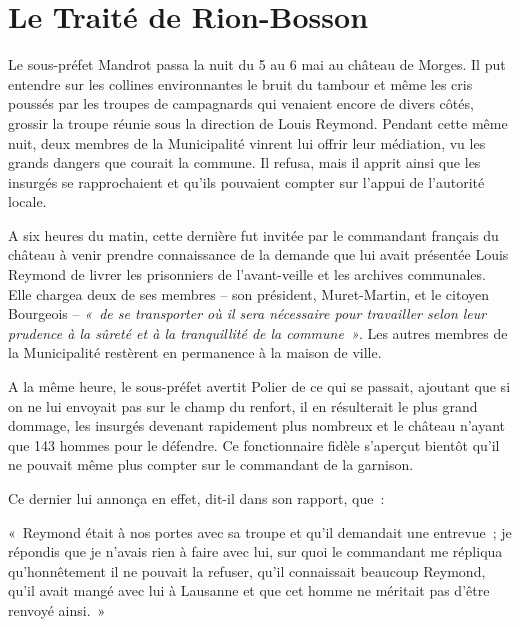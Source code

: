 \documentclass[french,twoside]{book} %
\newenvironment{quoteblock}%
  {\begin{quoting}}
  {\end{quoting}}
\newenvironment{quotebar}{%
    \def\FrameCommand{{\color{rubric!10!}\vrule width 0.5em} \hspace{0.9em}}%
    \def\OuterFrameSep{\itemsep} %
    \MakeFramed {\advance\hsize-\width \FrameRestore}
  }%
  {%
    \endMakeFramed
  }
\renewenvironment{quoteblock}%
  {%
    \savenotes
    \setstretch{0.9}
    \normalfont
    \begin{quotebar}
  }
  {%
    \end{quotebar}
    \spewnotes
  }
\begin{document}
\section[Le Traité de Rion-Bosson]{Le Traité de Rion-Bosson}
\noindent Le sous-préfet Mandrot passa la nuit du 5 au 6 mai au château de Morges. Il put entendre sur les collines environnantes le bruit du tambour et même les cris poussés par les troupes de campagnards qui venaient encore de divers côtés, grossir la troupe réunie sous la direction de Louis Reymond. Pendant cette même nuit, deux membres de la Municipalité vinrent lui offrir leur médiation, vu les grands dangers que courait la commune. Il refusa, mais il apprit ainsi que les insurgés se rapprochaient et qu’ils pouvaient compter sur l’appui de l’autorité locale.\par
A six heures du matin, cette dernière fut invitée par le commandant français du château à venir prendre connaissance de la demande que lui avait présentée Louis Reymond de livrer les prisonniers de l’avant-veille et les archives communales. Elle chargea deux de ses membres – son président, Muret-Martin, et le citoyen Bourgeois – \emph{« de se transporter où il sera nécessaire pour travailler selon leur prudence à la sûreté et à la tranquillité de la commune »}. Les autres membres de la Municipalité restèrent en permanence à la maison de ville.\par
A la même heure, le sous-préfet avertit Polier de ce qui se passait, ajoutant que si on ne lui envoyait pas sur le champ du renfort, il en résulterait le plus grand dommage, les insurgés devenant rapidement plus nombreux et le château n’ayant que 143 hommes pour le défendre. Ce fonctionnaire fidèle s’aperçut bientôt qu’il ne pouvait même plus compter sur le commandant de la garnison.\par
Ce dernier lui annonça en effet, dit-il dans son rapport, que :\par

\begin{quoteblock}
\noindent « Reymond était à nos portes avec sa troupe et qu’il demandait une entrevue ; je répondis que je n’avais rien à faire avec lui, sur quoi le commandant me répliqua qu’honnêtement il ne pouvait la refuser, qu’il connaissait beaucoup Reymond, qu’il avait mangé avec lui à Lausanne et que cet homme ne méritait pas d’être renvoyé ainsi. »\end{quoteblock}
\end{document}
